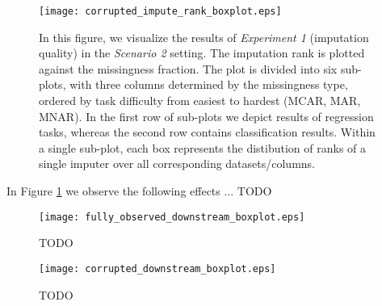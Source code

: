 \begin{figure}\centering
    \texttt{[image: corrupted\_impute\_rank\_boxplot.eps]}

    \caption[Scenario 2 Imputation Ranks]{In this figure, we visualize the results of \textit{Experiment 1} (imputation quality) in the \textit{Scenario 2} setting. The imputation rank is plotted against the missingness fraction. The plot is divided into six sub-plots, with three columns determined by the missingness type, ordered by task difficulty from easiest to hardest (MCAR, MAR, MNAR). In the first row of sub-plots we depict results of regression tasks, whereas the second row contains classification results. Within a single sub-plot, each box represents the distibution of ranks of a single imputer over all corresponding datasets/columns.
    }
	\label{fig:corrupted_impute_rank_boxplot}
\end{figure}

In Figure \ref{fig:corrupted_impute_rank_boxplot} we observe the following effects ...
TODO



\begin{figure}\centering
	\texttt{[image: fully\_observed\_downstream\_boxplot.eps]}

	\caption[TODO]{TODO}
	\label{fig:fully_observed_downstream_boxplot}
\end{figure}

\begin{figure}\centering
	\texttt{[image: corrupted\_downstream\_boxplot.eps]}

	\caption[TODO]{TODO}
	\label{fig:corrupted_downstream_boxplot}
\end{figure}
